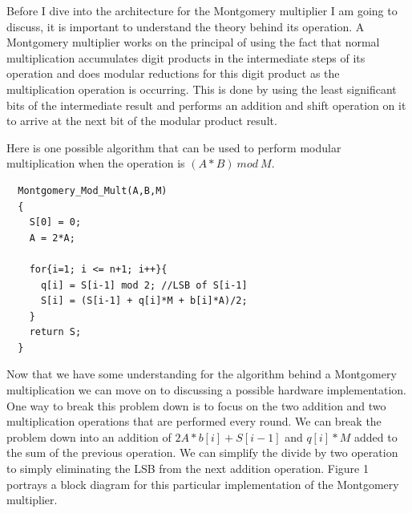 \documentclass[journal]{IEEEtran}
\begin{document}
Before I dive into the architecture for the Montgomery multiplier I am going to discuss, it is important to understand the theory behind its operation. A Montgomery multiplier works on the principal of using the fact that normal multiplication accumulates digit products in the intermediate steps of its operation and does modular reductions for this digit product as the multiplication operation is occurring. This is done by using the least significant bits of the intermediate result and performs an addition and shift operation on it to arrive at the next bit of the modular product result. 

Here is one possible algorithm that can be used to perform modular multiplication when the operation is $(A * B)\ mod\ M$. \\

\begin{lstlisting}
  Montgomery_Mod_Mult(A,B,M)
  {
    S[0] = 0;
    A = 2*A;
	  
    for{i=1; i <= n+1; i++}{
      q[i] = S[i-1] mod 2; //LSB of S[i-1]
      S[i] = (S[i-1] + q[i]*M + b[i]*A)/2;
    }
    return S;
  }
\end{lstlisting}

Now that we have some understanding for the algorithm behind a Montgomery multiplication we can move on to discussing a possible hardware implementation. One way to break this problem down is to focus on the two addition and two multiplication operations that are performed every round. We can break the problem down into an addition of $2A*b[i] + S[i-1]$ and $q[i]*M$ added to the sum of the previous operation. We can simplify the divide by two operation to simply eliminating the LSB from the next addition operation. Figure 1 portrays a block diagram for this particular implementation of the Montgomery multiplier. \\
\end{document}
